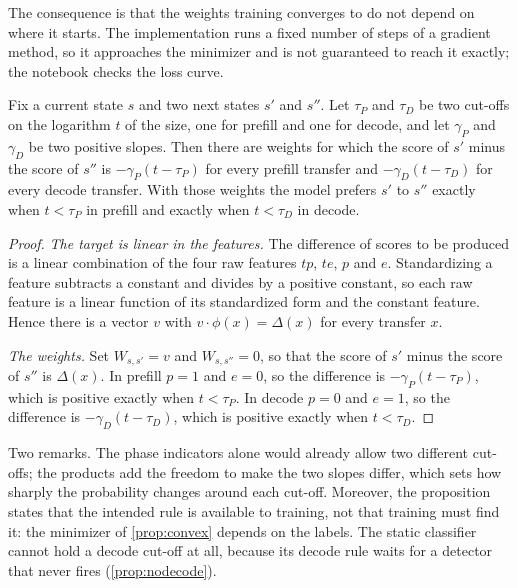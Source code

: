 The consequence is that the weights training converges to do not depend on
where it starts. The implementation runs a fixed number of steps of a
gradient method, so it approaches the minimizer and is not guaranteed to
reach it exactly; the notebook checks the loss curve.

\begin{proposition}
\label{prop:cutoff}%
Fix a current state $s$ and two next states $s'$ and $s''$. Let $\tau_P$ and
$\tau_D$ be two cut-offs on the logarithm $t$ of the size, one for prefill
and one for decode, and let $\gamma_P$ and $\gamma_D$ be two positive slopes.
Then there are weights for which the score of $s'$ minus the score of $s''$
is $-\gamma_P (t - \tau_P)$ for every prefill transfer and
$-\gamma_D (t - \tau_D)$ for every decode transfer. With those weights the
model prefers $s'$ to $s''$ exactly when $t < \tau_P$ in prefill and exactly
when $t < \tau_D$ in decode.
\end{proposition}

\begin{proof}
\emph{The target is linear in the features.} The difference of scores to be
produced is
a linear combination of the four raw features $t p$, $t e$, $p$ and $e$.
Standardizing a feature subtracts a constant and divides by a positive
constant, so each raw feature is a linear function of its standardized form
and the constant feature. Hence there is a vector $v$ with
$v \cdot \phi(x) = \Delta(x)$ for every transfer $x$.

\emph{The weights.} Set $W_{s,s'} = v$ and $W_{s,s''} = 0$, so that the score
of $s'$ minus the score of $s''$ is $\Delta(x)$. In prefill $p = 1$ and
$e = 0$, so the difference is $-\gamma_P (t - \tau_P)$, which is positive
exactly when $t < \tau_P$. In decode $p = 0$ and $e = 1$, so the difference
is $-\gamma_D (t - \tau_D)$, which is positive exactly when $t < \tau_D$.
\end{proof}

Two remarks. The phase indicators alone would already allow two different
cut-offs; the products add the freedom to make the two slopes differ, which
sets how sharply the probability changes around each cut-off. Moreover, the proposition states that the intended rule is available to training, not that
training must find it: the minimizer of \cref{prop:convex} depends on the
labels. The static classifier cannot hold a decode cut-off at all, because
its decode rule waits for a detector that never fires
(\cref{prop:nodecode}).

